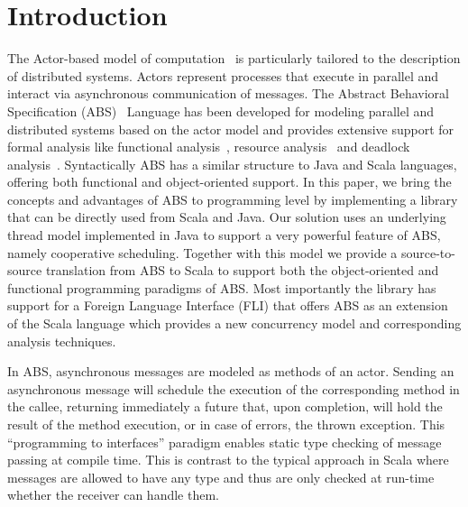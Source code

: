 \section{Introduction}



The Actor-based model of computation~\cite{Agha} is particularly tailored to the description of distributed systems. 
Actors represent processes that execute in parallel and interact via asynchronous communication of messages. 
The Abstract Behavioral Specification (ABS)~\cite{abs} Language has been developed for modeling parallel and distributed systems based on the actor model and provides extensive support for formal analysis like functional analysis~\cite{KeY}, resource analysis~\cite{saco} and deadlock analysis~\cite{dead}. Syntactically ABS has a similar structure to Java and Scala languages, offering both functional and object-oriented support.
In this paper, we bring the concepts and advantages of ABS to programming level by implementing a library that can be directly used from Scala and Java. Our solution uses an underlying thread model implemented in Java to support a very powerful feature of ABS, namely cooperative scheduling. Together with this model we provide a source-to-source translation from ABS to Scala to support both the object-oriented and functional programming paradigms of ABS. Most importantly the library has support for a Foreign Language Interface (FLI) that offers ABS as an extension of the Scala language which provides a new concurrency model and corresponding analysis techniques.


\par In ABS, asynchronous messages are modeled as methods of an actor.
Sending an asynchronous message will schedule the execution of the corresponding method in the callee, returning immediately a future that, upon completion, will hold the result of the method execution, or in case of errors, the thrown exception.
This ``programming to interfaces'' paradigm enables static type checking of message passing at compile time.
This is contrast to the typical approach in Scala where messages are allowed to have any type and thus are only checked at run-time whether the receiver can handle them.

